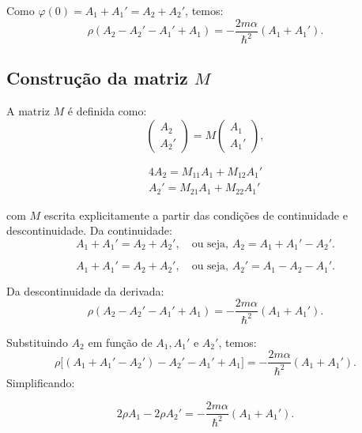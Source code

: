 \documentclass[a4paper,12pt]{article}
\begin{document}
\begin{enumerate}
Como \( \varphi(0) = A_1 + A_1' = A_2 + A_2' \), temos:
\begin{equation}
\rho (A_2 - A_2' - A_1' + A_1) = -\frac{2m\alpha}{\hbar^2} (A_1 + A_1').
\end{equation}

\subsection*{Construção da matriz \( M \)}
A matriz \( M \) é definida como:
\begin{equation}
\begin{pmatrix}
A_2 \\
A_2'
\end{pmatrix}
= M
\begin{pmatrix}
A_1 \\
A_1'
\end{pmatrix},
\end{equation}

\begin{alignat}{4}
    A_2 = M_{11} A_1 + M_{12} A_1' \\
    A_2' = M_{21} A_1 + M_{22} A_1'
 \end{alignat}

com \( M \) escrita explicitamente a partir das condições de continuidade e descontinuidade. Da continuidade:
\begin{equation}
A_1 + A_1' = A_2 + A_2', \quad \text{ou seja, } A_2 = A_1 + A_1' - A_2'.
\end{equation}

\begin{equation}
    A_1 + A_1' = A_2 + A_2', \quad \text{ou seja, } A_2' = A_1 - A_2 - A_1'.
\end{equation}

Da descontinuidade da derivada:
\begin{equation}
\rho (A_2 - A_2' - A_1' + A_1) = -\frac{2m\alpha}{\hbar^2} (A_1 + A_1').
\end{equation}

Substituindo \( A_2 \) em função de \( A_1, A_1' \) e \( A_2' \), temos:
\begin{equation}
\rho \big[(A_1 + A_1' - A_2') - A_2' - A_1' + A_1 \big] = -\frac{2m\alpha}{\hbar^2} (A_1 + A_1').
\end{equation}
Simplificando:

\begin{equation}
2\rho A_1 - 2\rho A_2' = -\frac{2m\alpha}{\hbar^2} (A_1 + A_1').
\end{equation}


\end{enumerate}
\end{document}
